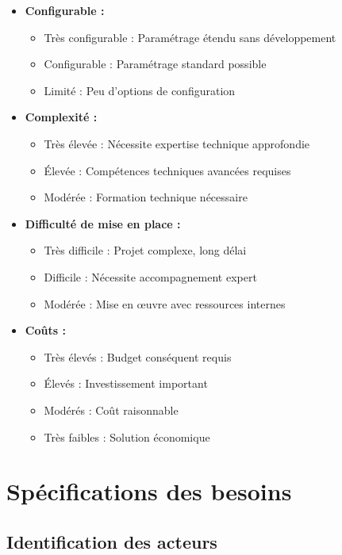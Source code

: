 \begin{itemize}
\item \textbf{Configurable :}
    \begin{itemize}
    \item Très configurable : Paramétrage étendu sans développement
    \item Configurable : Paramétrage standard possible
    \item Limité : Peu d'options de configuration
    \end{itemize}

\item \textbf{Complexité :}
    \begin{itemize}
    \item Très élevée : Nécessite expertise technique approfondie
    \item Élevée : Compétences techniques avancées requises
    \item Modérée : Formation technique nécessaire
    \end{itemize}

\item \textbf{Difficulté de mise en place :}
    \begin{itemize}
    \item Très difficile : Projet complexe, long délai
    \item Difficile : Nécessite accompagnement expert
    \item Modérée : Mise en œuvre avec ressources internes
    \end{itemize}

\item \textbf{Coûts :}
    \begin{itemize}
    \item Très élevés : Budget conséquent requis
    \item Élevés : Investissement important
    \item Modérés : Coût raisonnable
    \item Très faibles : Solution économique
    \end{itemize}
\end{itemize}

\section{Spécifications des besoins}

\subsection{Identification des acteurs}

